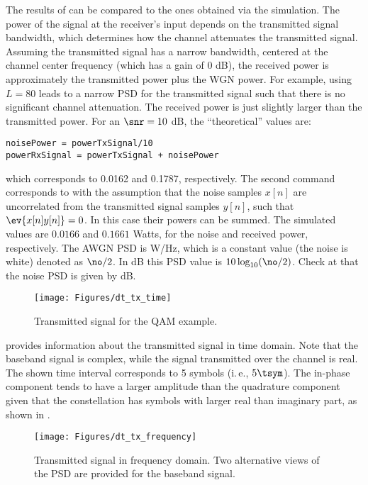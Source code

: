 The results of  can be compared to the ones obtained via the simulation. The power of the signal at the receiver's input depends on the transmitted signal bandwidth, which determines how the channel attenuates the transmitted signal. Assuming the transmitted signal has a narrow bandwidth, centered at the channel center frequency (which has a gain of 0 dB), the received power is approximately the transmitted power plus the WGN power. For example, using $L=80$ leads to a narrow PSD for the transmitted signal such that there is no significant channel attenuation. The received power is just slightly larger than the transmitted power. For an $\snr=10$ dB, the ``theoretical'' values are:
\begin{lstlisting}
noisePower = powerTxSignal/10
powerRxSignal = powerTxSignal + noisePower
\end{lstlisting}
which corresponds to 0.0162 and 0.1787, respectively.
The second command corresponds to  with the assumption that the noise samples $x[n]$ are uncorrelated
from the transmitted signal samples $y[n]$, such that $\ev\{x[n] y[n]\}=0$. In this case their powers can be summed. The simulated values are $0.0166$ and $0.1661$ Watts, for the noise and received power, respectively. 
The AWGN PSD is  W/Hz, which is a constant value (the noise is white) denoted as $\no/2$. In dB this PSD value is $10 \log_{10}(\no/2)$.
Check at  that the noise PSD is given by   dB.
 
\begin{figure}[htbp]
\centering
\texttt{[image: Figures/dt\_tx\_time]}
\caption{Transmitted signal for the QAM example.\label{fig:dt_tx_time}}
\end{figure}

 provides information about the transmitted signal in time domain. Note that the baseband signal is complex, while the signal transmitted over the channel is real. The shown time interval corresponds to 5 symbols (i.\,e., $5 \tsym$). The in-phase component tends to have a larger amplitude than the quadrature component given that the constellation has symbols with larger real than imaginary part, as shown in .

\begin{figure}[htbp]
\centering
\texttt{[image: Figures/dt\_tx\_frequency]}
\caption{Transmitted signal in frequency domain. Two alternative views of the PSD are provided for the baseband signal.\label{fig:dt_tx_frequency}}
\end{figure}

